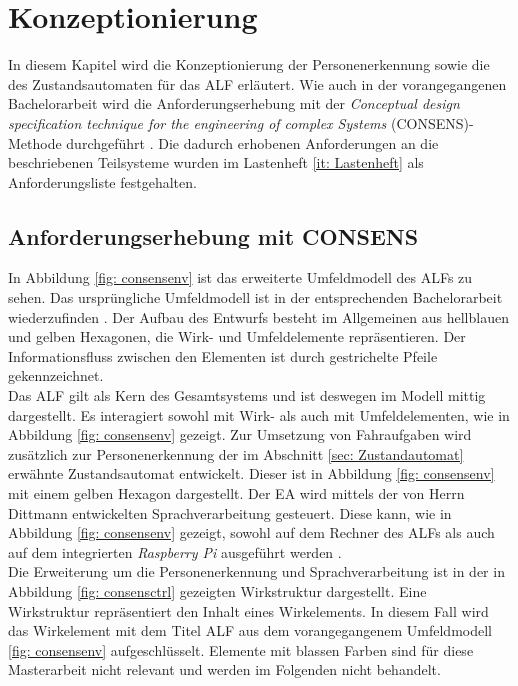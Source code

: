 \chapter{Konzeptionierung}
\label{ch: Konzeptionierung}

In diesem Kapitel wird die Konzeptionierung der Personenerkennung sowie die des Zustandsautomaten für das ALF erläutert. Wie auch in der vorangegangenen Bachelorarbeit wird die Anforderungserhebung mit der \textit{Conceptual design specification technique for the engineering of complex Systems} (CONSENS)-Methode durchgeführt \cite{Bachelorarbeit}. Die dadurch erhobenen Anforderungen an die beschriebenen Teilsysteme wurden im Lastenheft \ref{it: Lastenheft} als Anforderungsliste festgehalten.
	
	
	\section{Anforderungserhebung mit CONSENS}
	\label{sec: Anforderungserhebung}
	
	In Abbildung \ref{fig: consensenv} ist das erweiterte Umfeldmodell des ALFs zu sehen. Das ursprüngliche Umfeldmodell ist in der entsprechenden Bachelorarbeit wiederzufinden \cite{Bachelorarbeit}. Der Aufbau des Entwurfs besteht im Allgemeinen aus hellblauen und gelben Hexagonen, die Wirk- und Umfeldelemente repräsentieren. Der Informationsfluss zwischen den Elementen ist durch gestrichelte Pfeile gekennzeichnet.\\
	
	Das ALF gilt als Kern des Gesamtsystems und ist deswegen im Modell mittig dargestellt. Es interagiert sowohl mit Wirk- als auch mit Umfeldelementen, wie in Abbildung \ref{fig: consensenv} gezeigt. Zur Umsetzung von Fahraufgaben wird zusätzlich zur Personenerkennung der im Abschnitt \ref{sec: Zustandautomat} erwähnte Zustandsautomat entwickelt. Dieser ist in Abbildung \ref{fig: consensenv} mit einem gelben Hexagon dargestellt. Der EA wird mittels der von Herrn Dittmann entwickelten Sprachverarbeitung gesteuert. Diese kann, wie in Abbildung \ref{fig: consensenv} gezeigt, sowohl auf dem Rechner des ALFs als auch auf dem integrierten \textit{Raspberry Pi} ausgeführt werden \cite{Dittmann}. \\
	
		
	
	Die Erweiterung um die Personenerkennung und Sprachverarbeitung ist in der in Abbildung \ref{fig: consensctrl} gezeigten Wirkstruktur dargestellt. Eine Wirkstruktur repräsentiert den Inhalt eines Wirkelements. In diesem Fall wird das Wirkelement mit dem Titel ALF aus dem vorangegangenem Umfeldmodell \ref{fig: consensenv} aufgeschlüsselt. Elemente mit blassen Farben sind für diese Masterarbeit nicht relevant und werden im Folgenden nicht behandelt.\\
	
